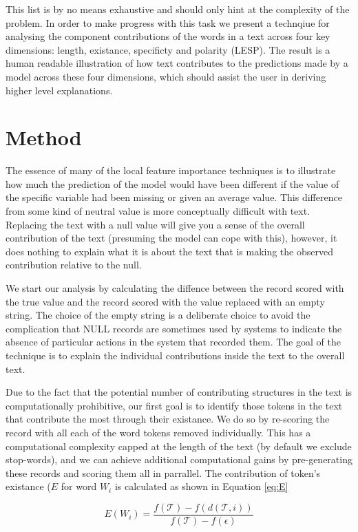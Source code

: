 \documentclass[12pt,a4paper]{article}
\numberwithin{equation}{section}
\begin{document}
This list is by no means exhaustive and should only hint at the complexity of the problem. In order to make progress with this task we
present a technqiue for analysing the component contributions of the words in a text across four key dimensions: length, existance,
specificty and polarity (LESP). The result is a human readable illustration of how text contributes to the predictions made by a model
across these four dimensions, which should assist the user in deriving higher level explanations. 


\section{Method}

The essence of many of the local feature importance techniques is to illustrate how much the prediction of the model would have been
different if the value of the specific variable had been missing or given an average value. This difference from some kind of neutral
value is more conceptually difficult with text. Replacing the text with a null value will give you a sense of the overall contribution
of the text (presuming the model can cope with this), however, it does nothing to explain what it is about the text that is making the
observed contribution relative to the null.

We start our analysis by calculating the diffence between the record scored with the true value and the record scored with the value replaced
with an empty string. The choice of the empty string is a deliberate choice to avoid the complication that NULL records are sometimes used
by systems to indicate the absence of particular actions in the system that recorded them. The goal of the technique is to explain the individual
contributions inside the text to the overall text.

Due to the fact that the potential number of contributing structures in the text is computationally prohibitive, our first goal is to identify
those tokens in the text that contribute the most through their existance. We do so by re-scoring the record with all each of the word tokens
removed individually. This has a computational complexity capped at the length of the text (by default we exclude stop-words), and we can
achieve additional computational gains by pre-generating these records and scoring them all in parrallel. The contribution of token's
existance ($E$ for word $W_i$ is calculated as shown in Equation \ref{eq:E}

\begin{equation}
\label{eq:E}
E(W_i) = \frac{ f(\mathscr{T}) - f( d(\mathscr{T},i) ) }{ f(\mathscr{T}) - f(\epsilon) }
\end{equation}
\end{document}
